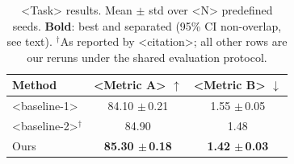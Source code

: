 \begin{table}[t]
  \centering
  \caption{<Task> results. Mean $\pm$ std over <N> predefined seeds.
    \textbf{Bold}: best and separated (95\% CI non-overlap, see text).
    $^\dagger$As reported by <citation>; all other rows are our reruns
    under the shared evaluation protocol.}
  \label{tab:main-results}
  \begin{tabular}{lcc}
    \toprule
    Method & <Metric A> $\uparrow$ & <Metric B> $\downarrow$ \\
    \midrule
    <baseline-1> & 84.10 {\scriptsize$\pm$\,0.21} & 1.55 {\scriptsize$\pm$\,0.05} \\
    <baseline-2>$^\dagger$ & 84.90 & 1.48 \\
    \midrule
    Ours & \textbf{85.30 {\scriptsize$\pm$\,0.18}} & \textbf{1.42 {\scriptsize$\pm$\,0.03}} \\
    \bottomrule
  \end{tabular}
\end{table}
